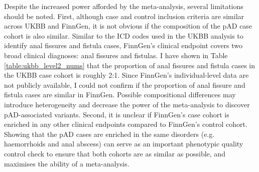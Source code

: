 
Despite the increased power afforded by the meta-analysis, several limitations should be noted. First, although case and control inclusion criteria are similar across UKBB and FinnGen, it is not obvious if the composition of the pAD case cohort is also similar. Similar to the ICD codes used in the UKBB analysis to identify anal fissures and fistula cases, FinnGen's clinical endpoint covers two broad clinical diagnoses: anal fissures and fistulas. I have shown in Table \ref{table:ukbb_level2_nums} that the proportion of anal fissures and fistula cases in the UKBB case cohort is roughly 2:1. Since FinnGen's individual-level data are not publicly available, I could not confirm if the proportion of anal fissure and fistula cases are similar in FinnGen. Possible compositional differences may introduce heterogeneity and decrease the power of the meta-analysis to discover pAD-associated variants. Second, it is unclear if FinnGen's case cohort is enriched in any other clinical endpoints compared to FinnGen's control cohort. Showing that the pAD cases are enriched in the same disorders (e.g. haemorrhoids and anal abscess) can serve as an important phenotypic quality control check to ensure that both cohorts are as similar as possible, and maximises the ability of a meta-analysis.\\ %

